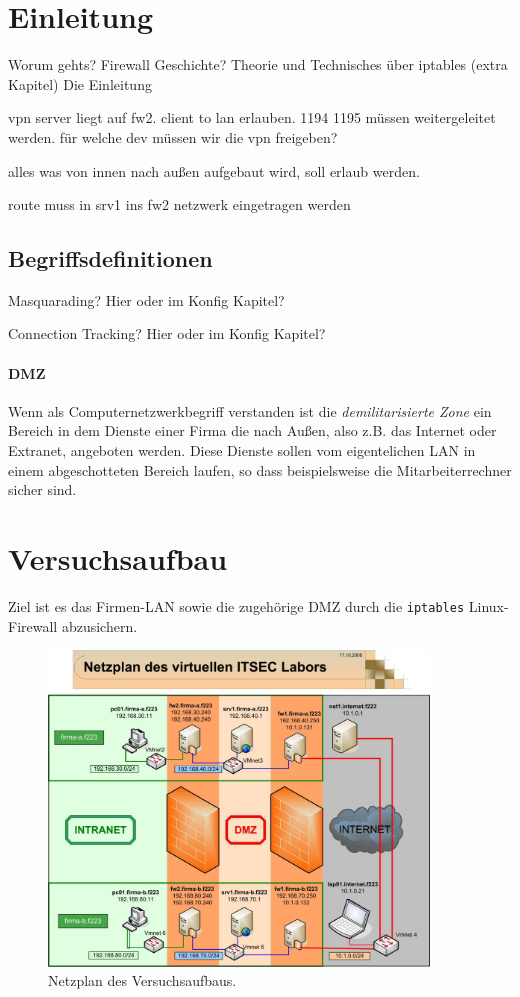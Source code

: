 \section{Einleitung}

Worum gehts? Firewall Geschichte? Theorie und Technisches über iptables (extra Kapitel)
Die Einleitung \cite{iptables}

vpn server liegt auf fw2. client to lan erlauben. 1194 1195 müssen weitergeleitet werden. für welche dev müssen wir die vpn freigeben?

alles was von innen nach außen aufgebaut wird, soll erlaub werden.

route muss in srv1 ins fw2 netzwerk eingetragen werden

\subsection{Begriffsdefinitionen}

Masquarading? Hier oder im Konfig Kapitel?

Connection Tracking? Hier oder im Konfig Kapitel?

\paragraph{DMZ}
Wenn als Computernetzwerkbegriff verstanden ist die
\emph{demilitarisierte Zone} ein Bereich in dem Dienste einer Firma die nach Außen,
also z.B. das Internet oder Extranet, angeboten werden. Diese Dienste sollen
vom eigentelichen LAN in einem abgeschotteten Bereich laufen, so dass
beispielsweise die Mitarbeiterrechner sicher sind.


\section{Versuchsaufbau}

Ziel ist es das Firmen-LAN sowie die zugehörige DMZ durch die
{\tt iptables} Linux-Firewall abzusichern.

\begin{figure}[h!]
  \centering
    \includegraphics[width=0.9\textwidth]{figures/Netzplan.jpg}
  \caption{Netzplan des Versuchsaufbaus.\cite{labor}}
  \label{fig.netzplan}
\end{figure}

